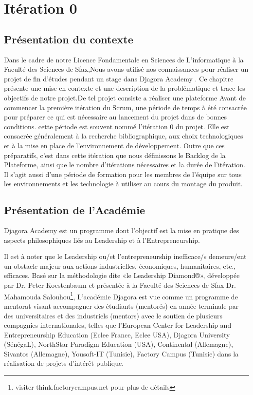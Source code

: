 \section{Itération 0}
\subsection{Présentation du contexte}
Dans le cadre de notre Licence Fondamentale en Sciences de L'informatique à 
la Faculté des Sciences de Sfax,Nous avons utilisé nos connaissances pour 
réaliser un projet de fin d'études pendant un stage dans Djagora Academy .
Ce chapitre présente une mise en contexte et une description de la problématique
et trace les objectifs de notre projet.De tel projet consiste a réaliser une
plateforme
Avant de commencer la première itération du Scrum, une période de temps à été
consacrée pour préparer ce qui est nécessaire au lancement du projet dans de bonnes
conditions. cette période est souvent nommé l’itération 0 du projet. Elle est consacrée
généralement à la recherche bibliographique, aux choix technologiques et à la mise en
place de l’environnement de développement. Outre que ces préparatifs, c’est dans cette
itération que nous définissons le Backlog de la Plateforme, ainsi que le nombre
d’itérations nécessaires et la durée de l’itération. Il s’agit aussi d’une période de
formation pour les membres de l’équipe sur tous les environnements et les technologie à
utiliser au cours du montage du produit.
\subsection{Présentation de l'Académie}
Djagora Academy est un programme dont l'objectif est la mise en pratique des
aspects philosophiques liés au Leadership et à l'Entrepreneurship.

Il est à noter que le Leadership ou/et l'entrepreneurship inefficace/s
demeure/ent un obstacle majeur aux actions industrielles, économiques,
humanitaires, etc., efficaces.
Basé sur la méthodologie dite «le Leadership Diamond®», développée par Dr. Peter
Koestenbaum et présentée à la Faculté des Sciences de Sfax Dr. Mahamouda
Salouhou\footnote{visiter think.factorycampus.net pour plus de détails},
L'académie Djagora est vue comme un programme de mentorat visant accompagner des
étudiants (mentorés) en année terminale par des universitaires et des
industriels (mentors) avec le soutien de plusieurs compagnies internationales,
telles que l'European Center for Leadership and Entrepreneurship Education
(Eclee France, Eclee USA), Djagora University (SénégaL), NorthStar Paradigm
Education (USA), Continental (Allemagne), Sivantos (Allemagne), Yousoft-IT
(Tunisie), Factory Campus (Tunisie) dans la réalisation de projets d’intérêt
publique.

